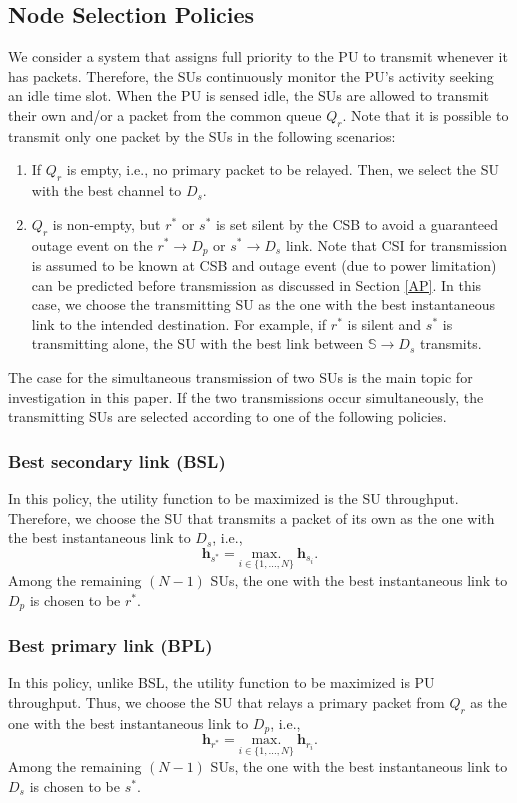 \documentclass[journal,twocolumn]{IEEEtran}
\begin{document}
\subsection{Node Selection Policies}\label{node_selection}
We consider a system that assigns full priority to the PU to transmit whenever it has packets. Therefore, the SUs continuously monitor the PU's
activity seeking an idle time slot. When the PU is sensed idle, the SUs are allowed to transmit their own and/or a packet from the common queue $Q_r$. Note that it is possible to transmit only one packet by the SUs in the following scenarios:
\begin{enumerate}
  \item If $Q_{r}$ is empty, i.e., no primary packet to be relayed. Then, we select the SU with the best channel to $D_s$.
  \item $Q_{r}$ is non-empty, but $r^*$ or $s^*$ is set silent by the CSB to avoid a guaranteed outage event on the $r^*\to D_p$ or $s^*\to D_s$ link. Note that CSI for transmission is assumed to be known at CSB and outage event (due to power limitation) can be predicted before transmission as discussed in Section \ref{AP}. In this case, we choose the transmitting SU as the one with the best instantaneous link to the intended destination. For example, if $r^*$ is silent and $s^*$ is transmitting alone, the SU with the best link
    between $\mathbb{S} \to D_{s}$ transmits.
\end{enumerate}
The case for the simultaneous transmission of two SUs is the main topic for investigation in this paper. If the two transmissions occur simultaneously, the transmitting SUs are selected according to one of the following policies.

\subsubsection{Best secondary link (BSL)}\label{BSL}
In this policy, the utility function to be maximized is the SU throughput. Therefore,
we choose the SU that transmits a packet of its own as the one with the best instantaneous link to $D_{s}$, i.e.,
\begin{equation}
\mathbf{h}_{s^*}=\underset{i \in \{1,\hdots,N\}}{\mathrm{max.}}~\mathbf{h}_{s_{i}}.
\end{equation}
Among the remaining $(N-1)$ SUs, the one with the best instantaneous link to $D_{p}$ is chosen to be $r^*$.

\subsubsection{Best primary link (BPL)}\label{BPL}
In this policy, unlike BSL, the utility function to be maximized is PU throughput. Thus,
we choose the SU that relays a primary packet from $Q_{r}$ as the one with the best instantaneous link to $D_{p}$, i.e.,
\begin{equation}
\mathbf{h}_{r^*}=\underset{i \in \{1,\hdots,N\}}{\mathrm{max.}}~\mathbf{h}_{r_{i}}.
\end{equation}
Among the remaining $(N-1)$ SUs, the one with the best instantaneous link to $D_{s}$ is chosen to be $s^*$.
\end{document}

